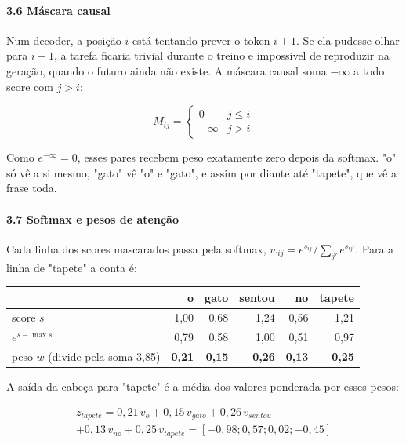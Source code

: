 \documentclass[12pt, a4paper]{article}
\begin{document}
\paragraph{3.6 Máscara causal}\label{36-muxe1scara-causal}

Num decoder, a posição \(i\) está tentando prever o token \(i+1\). Se ela pudesse olhar para \(i+1\), a tarefa ficaria trivial durante o treino e impossível de reproduzir na geração, quando o futuro ainda não existe. A máscara causal soma \(-\infty\) a todo score com \(j > i\):

\[M_{ij} = \begin{cases} 0 & j \le i \\ -\infty & j > i \end{cases}\]

Como \(e^{-\infty} = 0\), esses pares recebem peso exatamente zero depois da softmax. "o" só vê a si mesmo, "gato" vê "o" e "gato", e assim por diante até "tapete", que vê a frase toda.

\paragraph{3.7 Softmax e pesos de atenção}\label{37-softmax-e-pesos-de-atenuxe7uxe3o}

Cada linha dos scores mascarados passa pela softmax, \(w_{ij} = e^{s_{ij}} / \sum_{j'} e^{s_{ij'}}\). Para a linha de "tapete" a conta é:

\begin{longtable}{@{}lrrrrr@{}}
\toprule\noalign{}
& o & gato & sentou & no & tapete \\
\midrule\noalign{}
\endhead
\bottomrule\noalign{}
\endlastfoot
score \(s\) & 1,00 & 0,68 & 1,24 & 0,56 & 1,21 \\
\(e^{s - \max s}\) & 0,79 & 0,58 & 1,00 & 0,51 & 0,97 \\
peso \(w\) (divide pela soma 3,85) & \textbf{0,21} & \textbf{0,15} & \textbf{0,26} & \textbf{0,13} & \textbf{0,25} \\
\end{longtable}

A saída da cabeça para "tapete" é a média dos valores ponderada por esses pesos:

\begin{multline*}
z_{tapete} = 0{,}21\, v_{o} + 0{,}15\, v_{gato} + 0{,}26\, v_{sentou} \\
  + 0{,}13\, v_{no} + 0{,}25\, v_{tapete} = [-0{,}98;\allowbreak 0{,}57;\allowbreak 0{,}02;\allowbreak -0{,}45]
\end{multline*}
\end{document}
